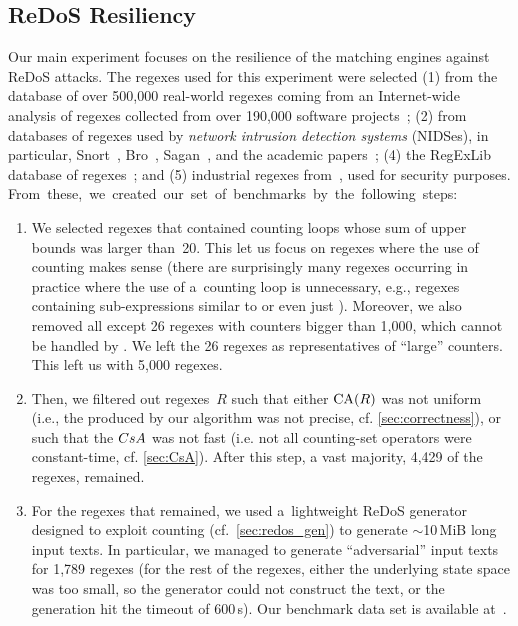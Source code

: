 \documentclass[acmsmall,screen]{acmart}
\begin{document}
\subsection{ReDoS Resiliency}\label{sec:exp_redos}
\vspace{-0.0mm}
Our main experiment focuses on the resilience of the matching engines
against ReDoS attacks.
The regexes used for this experiment were selected (1) from the database of over
500,000 real-world regexes coming
%
from an Internet-wide analysis of regexes collected from over 190,000 software
projects~\cite{DavisMCSL19}; 
(2) from databases of regexes used by \emph{network intrusion detection systems} 
(NIDSes), in particular, Snort~\cite{snort},
Bro~\cite{bro},
Sagan~\cite{sagan}, and the academic
papers~\cite{yang2010,tacas18-appred};
(4) the RegExLib database of regexes~\cite{regexlib}; and
(5) industrial regexes from~\cite{aplas19}, used for security purposes.
\mbox{From these, we created our set of benchmarks by the following steps:}
%
\begin{enumerate}[(1)]
  \item  We selected regexes that contained counting loops whose
    sum of upper bounds was larger than~20.
    This let us focus on regexes where the use of counting makes
    sense (there are surprisingly many regexes occurring in practice where the
    use of a~counting loop is unnecessary, e.g., regexes containing
    sub-expressions similar to  or even just ).
    Moreover, we also removed all except 26 regexes with counters bigger than
    1,000, which cannot be handled by \retwo.
    We left the 26 regexes as representatives of ``large'' counters.
    This left us with 5,000 regexes.
\cbstart
  \item  Then, we filtered out regexes~$R$ such that either $\textrm{CA}(R)$ was not uniform 
   (i.e., the \CSA produced by our algorithm was not precise, cf. \cref{sec:correctness}), 
   or such that the $CsA$ was not fast 
   (i.e. not all counting-set operators were constant-time, cf. \cref{sec:CsA}).
    After this step,
    a vast majority,
    4,429 
    of the regexes, remained. 
\cbend
  \item  For the regexes that remained, we used a~lightweight ReDoS generator designed to
    exploit counting (cf.~\cref{sec:redos_gen}) to generate $\sim$10\,MiB long
    input texts.
    In particular, we managed to generate ``adversarial'' input texts for
    1,789 
    regexes (for the rest of the regexes, either the underlying state space was
    too small, so the generator could not construct the text, or the generation hit the
    timeout of 600\,s).
    Our benchmark data set is available at~\cite{oopsla20-dataset}.
\end{enumerate}
\end{document}

